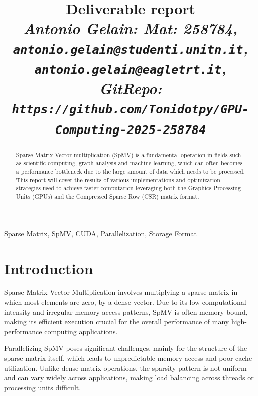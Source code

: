 \documentclass[conference]{IEEEtran}
\begin{document}
    \title{Deliverable report \\
    \footnotesize \textit{Antonio Gelain: Mat: 258784, \\
    \texttt{antonio.gelain@studenti.unitn.it}, \\
    \texttt{antonio.gelain@eagletrt.it}, \\
    GitRepo: \texttt{https://github.com/Tonidotpy/GPU-Computing-2025-258784}}}

    \maketitle

    \begin{abstract}
        Sparse Matrix-Vector multiplication (SpMV) is a fundamental operation
        in fields such as scientific computing, graph analysis and machine
        learning, which can often becomes a performance bottleneck due to the
        large amount of data which needs to be processed.
        This report will cover the results of various implementations and
        optimization strategies used to achieve faster computation leveraging
        both the Graphics Processing Units (GPUs) and the Compressed Sparse Row
        (CSR) matrix format.
    \end{abstract}

    \begin{IEEEkeywords}
        Sparse Matrix, SpMV, CUDA, Parallelization, Storage Format
    \end{IEEEkeywords}

    \section{Introduction} 
    
    Sparse Matrix-Vector Multiplication involves multiplying a sparse matrix in
    which most elements are zero, by a dense vector.
    Due to its low computational intensity and irregular memory access patterns,
    SpMV is often memory-bound, making its efficient execution crucial for the
    overall performance of many high-performance computing applications.

    Parallelizing SpMV poses significant challenges, mainly for the structure
    of the sparse matrix itself, which leads to unpredictable memory access
    and poor cache utilization.
    Unlike dense matrix operations, the sparsity pattern is not uniform and can
    vary widely across applications, making load balancing across threads or
    processing units difficult.
\end{document}
